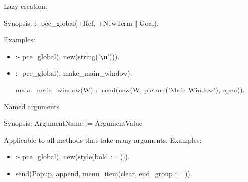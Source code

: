 \begin{sli}{Lazy creation: }

Synopsis: :- pce_global(+Ref, +NewTerm$\|$Goal).

Examples:

\begin{itemize}
    \item :- pce_global(, new(string('\verb$\n$'))).
    \item :- pce_global(, make_main_window).
\begin{code}
make_main_window(W) :-
        send(new(W, picture('Main Window'), open)).
\end{code}

\noindent
\end{itemize}
\end{sli}


\begin{sli}{Named arguments}

Synopsis: ArgumentName := ArgumentValue

Applicable to all methods that take many arguments.  Examples:

\begin{itemize}
    \item :- pce_global(, new(style(bold := ))).
    \item send(Popup, append, menu_item(clear, end_group := )).
\end{itemize}
\end{sli}


